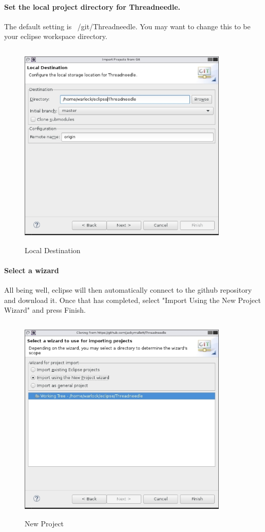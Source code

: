 \documentclass[a4latex]{article}
\begin{document}
\paragraph{Set the local project directory for Threadneedle.} 
The default setting
is ~/git/Threadneedle. You may want to change this to be your eclipse
workspace directory.
\begin{figure}[ht]
\centering
\includegraphics[height=10cm,width=10cm]{images/fig_local.eps}
\caption{Local Destination}
\label{fig:local}
\end{figure}
\par
\newpage
\paragraph{Select a wizard} 
\par
All being well, eclipse will then automatically connect to the github
repository and download it. Once that has completed, select "Import 
Using the New Project Wizard" and press Finish.
\begin{figure}[ht]
\centering
\includegraphics[height=10cm,width=10cm]{images/fig_newproject.eps}
\caption{New Project}
\label{fig:new}
\end{figure}
\end{document}
